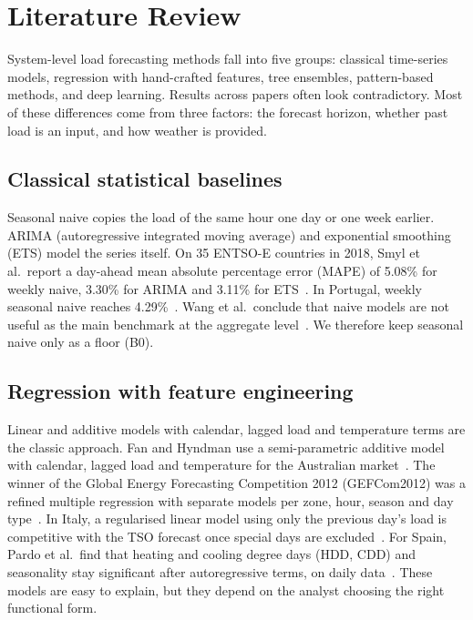 \section{Literature Review}
\label{sec:literature}


System-level load forecasting methods fall into five groups: classical time-series models,
regression with hand-crafted features, tree ensembles, pattern-based methods, and deep learning.
Results across papers often look contradictory. Most of these differences come from three
factors: the forecast horizon, whether past load is an input, and how weather is provided.

\subsection{Classical statistical baselines}
\label{sec:lit-classical}

Seasonal naive copies the load of the same hour one day or one week earlier. ARIMA (autoregressive integrated moving
average) and exponential smoothing (ETS) model the series itself. On 35 ENTSO-E countries in 2018, Smyl et al.\ report a day-ahead
mean absolute percentage error (MAPE) of 5.08\% for weekly naive, 3.30\% for ARIMA and 3.11\% for ETS~\cite{smyl2023esdrnn}. In
Portugal, weekly seasonal naive reaches 4.29\%~\cite{pelekis2023comparative}. Wang et al.\ conclude
that naive models are not useful as the main benchmark at the aggregate level~\cite{wang2016recency}.
We therefore keep seasonal naive only as a floor (B0).

\subsection{Regression with feature engineering}
\label{sec:lit-regression}

Linear and additive models with calendar, lagged load and temperature terms are the classic
approach. Fan and Hyndman use a semi-parametric additive model with calendar, lagged load and
temperature for the Australian market~\cite{fan2012semiparametric}. The winner of the Global Energy
Forecasting Competition 2012 (GEFCom2012) was a
refined multiple regression with separate models per zone, hour, season and day
type~\cite{charlton2014refined}. In Italy, a regularised linear model using only the previous day's
load is competitive with the TSO forecast once special days are excluded~\cite{incremona2021italian}.
For Spain, Pardo et al.\ find that heating and cooling degree days (HDD, CDD) and seasonality stay significant
after autoregressive terms, on daily data~\cite{pardo2002temperature}. These models are easy to
explain, but they depend on the analyst choosing the right functional form.

